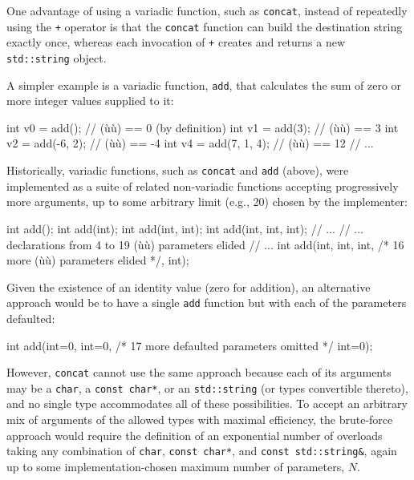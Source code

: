 \noindent One advantage of using a variadic function, such as \lstinline!concat!,
instead of repeatedly using the \lstinline!+! operator is that the
\lstinline!concat! function can build the destination string exactly once,
whereas each invocation of \lstinline!+! creates and returns a new
\lstinline!std::string! object.

A simpler example is a variadic function, \lstinline!add!, that calculates
the sum of zero or more integer values supplied to it:

\begin{emcppslisting}
int v0 = add();         // (ù{}ù) ==  0 (by definition)
int v1 = add(3);        // (ù{}ù) ==  3
int v2 = add(-6, 2);    // (ù{}ù) == -4
int v4 = add(7, 1, 4);  // (ù{}ù) == 12
// ...
\end{emcppslisting}
    

\noindent Historically, variadic functions, such as \lstinline!concat! and
\lstinline!add! (above), were implemented as a suite of related
non-variadic functions accepting progressively more arguments, up to
some arbitrary limit (e.g., 20) chosen by the implementer:

\begin{emcppslisting}
int add();
int add(int);
int add(int, int);
int add(int, int, int);
// ...
// ... declarations from 4 to 19 (ù{}ù) parameters elided
// ...
int add(int, int, int, /* 16 more (ù{}ù) parameters elided */, int);
\end{emcppslisting}
    

\noindent Given the existence of an identity value (zero for addition), an
alternative approach would be to have a single \lstinline!add! function but
with each of the parameters defaulted:

\begin{emcppslisting}
int add(int=0, int=0, /* 17 more defaulted parameters omitted */ int=0);
\end{emcppslisting}
    

\noindent However, \lstinline!concat! cannot use the same approach because each of
its arguments may be a \lstinline!char!, a \lstinline!const!~\lstinline!char*!,
or an \lstinline!std::string! (or types convertible thereto), and no single
type accommodates all of these possibilities. To accept an arbitrary mix
of arguments of the allowed types with maximal efficiency, the
brute-force approach would require the definition of an exponential
number of overloads taking any combination of \lstinline!char!,
\lstinline!const!~\lstinline!char*!, and
\lstinline!const!~\lstinline!std::string&!, again up to some
implementation-chosen maximum number of parameters, \(N\).

